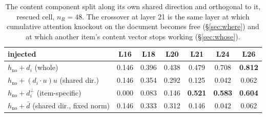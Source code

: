 \documentclass{article}
\newcommand{\dvec}{\ensuremath{d}}
\begin{document}
\begin{table}[h]
\caption{The content component split along its own shared direction and
orthogonal to it, rescued cell, $n_R=48$. The crossover at layer 21 is the same
layer at which cumulative attention knockout on the document becomes free
(\S\ref{sec:where}) and at which another item's content vector stops working
(\S\ref{sec:whose}).}
\label{tab:parperp}
\centering
\small
\begin{tabular}{lcccccc}
\toprule
injected & L16 & L18 & L20 & L21 & L24 & L26 \\
\midrule
$h_{\text{no}} + \dvec_i$ (whole)          & 0.146 & 0.396 & 0.438 & 0.479 & 0.708 & \textbf{0.812} \\
$h_{\text{no}} + (\dvec_i\!\cdot\!u)u$ (shared dir.) & 0.146 & 0.354 & 0.292 & 0.125 & 0.042 & 0.062 \\
$h_{\text{no}} + \dvec_i^{\perp}$ (item-specific)    & 0.000 & 0.083 & 0.146 & \textbf{0.521} & \textbf{0.583} & \textbf{0.604} \\
$h_{\text{no}} + \bar{\dvec}$ (shared dir., fixed norm) & 0.146 & 0.333 & 0.312 & 0.146 & 0.042 & 0.062 \\
\bottomrule
\end{tabular}
\end{table}
\end{document}
